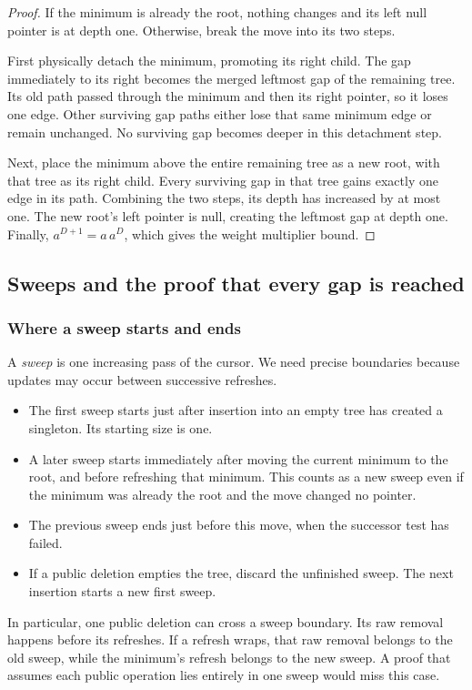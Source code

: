 \documentclass[11pt,a4paper]{article}
\theoremstyle{readable}
\begin{document}
\begin{proof}
If the minimum is already the root, nothing changes and its left null
pointer is at depth one. Otherwise, break the move into its two steps.

First physically detach the minimum, promoting its right child. The
gap immediately to its right becomes the merged leftmost gap of the
remaining tree. Its old path passed through the minimum and then its
right pointer, so it loses one edge. Other surviving gap paths either
lose that same minimum edge or remain unchanged. No surviving gap
becomes deeper in this detachment step.

Next, place the minimum above the entire remaining tree as a new root,
with that tree as its right child. Every surviving gap in that tree
gains exactly one edge in its path. Combining the two steps, its depth
has increased by at most one. The new root's left pointer is null,
creating the leftmost gap at depth one. Finally,
$a^{D+1}=a\,a^D$, which gives the weight multiplier bound.
\end{proof}

\subsection{Sweeps and the proof that every gap is reached}
\label{sec:sweeps}

\subsubsection*{Where a sweep starts and ends}
A \emph{sweep} is one increasing pass of the cursor. We need precise
boundaries because updates may occur between successive refreshes.
\begin{itemize}
  \item The first sweep starts just after insertion into an empty tree
        has created a singleton. Its starting size is one.
  \item A later sweep starts immediately after moving the current
        minimum to the root, and before refreshing that minimum.
        This counts as a new sweep even if the minimum was already
        the root and the move changed no pointer.
  \item The previous sweep ends just before this move, when the
        successor test has failed.
  \item If a public deletion empties the tree, discard the unfinished
        sweep. The next insertion starts a new first sweep.
\end{itemize}
In particular, one public deletion can cross a sweep boundary. Its raw
removal happens before its refreshes. If a refresh wraps, that raw
removal belongs to the old sweep, while the minimum's refresh belongs
to the new sweep. A proof that assumes each public operation lies
entirely in one sweep would miss this case.
\end{document}
